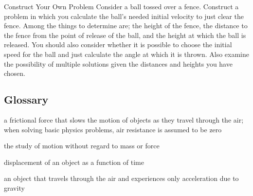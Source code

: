 \documentclass[
]{book}
\providecommand{\tightlist}{%
  \setlength{\itemsep}{0pt}\setlength{\parskip}{0pt}}
\newenvironment{problems-exercises}{}{}
\newenvironment{tinysection}{}{}
\begin{document}
\begin{problems-exercises}
\begin{tinysection}
\end{tinysection}

\hypertarget{fs-id1815382}{}
\hypertarget{fs-id2255165}{}
\begin{tinysection}

{Construct Your Own Problem} Consider a ball tossed
over a fence. Construct a problem in which you calculate the ball's
needed initial velocity to just clear the fence. Among the things to
determine are; the height of the fence, the distance to the fence from
the point of release of the ball, and the height at which the ball is
released. You should also consider whether it is possible to choose the
initial speed for the ball and just calculate the angle at which it is
thrown. Also examine the possibility of multiple solutions given the
distances and heights you have chosen.

\end{tinysection}

\end{problems-exercises}

\hypertarget{glossary-9}{%
\subsection{Glossary}\label{glossary-9}}

\begin{description}
\tightlist
\item[air resistance]
a frictional force that slows the motion of objects as they travel
through the air; when solving basic physics problems, air resistance
is assumed to be zero
\end{description}

\begin{description}
\tightlist
\item[kinematics]
the study of motion without regard to mass or force
\end{description}

\begin{description}
\tightlist
\item[motion]
displacement of an object as a function of time
\end{description}

\begin{description}
\tightlist
\item[projectile]
an object that travels through the air and experiences only
acceleration due to gravity
\end{description}
\end{document}
